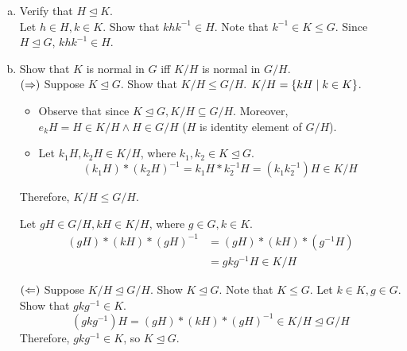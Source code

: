 \begin{solution} \phantom{blank}

    \begin{enumerate}[(a)]
        \item Verify that $H \unlhd K$. \\
        Let $h \in H, k \in K$. Show that $khk^{-1} \in H$. Note that $k^{-1} \in K \leq G$. Since $ H \unlhd G$, $khk^{-1} \in H$.
        \item Show that $K$ is normal in $G$ iff $K/H$ is normal in $G/H$.\\
        $\qty(\Rightarrow)$ Suppose $K \unlhd G$. Show that $K/H \leq G/H$. $K/H = \qty{kH \mid k \in K}$. 
        \begin{itemize}
            \item Observe that since $K \unlhd G, K/H \subseteq G/H$. Moreover, $e_kH = H \in K/H \land H \in G/H$ \hspace{1em} ($H$ is identity element of $G / H$).
            \item Let $k_1H, k_2H \in K/H$, where $k_1, k_2 \in K \unlhd G$.
            \[ (k_1H) \ast (k_2H)^{-1} = k_1H \ast k_2^{-1} H = (k_1k_2^{-1})H \in K/H \]
        \end{itemize}
        Therefore, $K/H \leq G/H$.
        
        Let $gH \in G/H, kH \in K/H$, where $g \in G, k \in K$.
        \begin{align*}
            (gH) \ast (kH) \ast (gH)^{-1} &= (gH) \ast (kH) \ast ( g^{-1}H) \\
            &= gkg^{-1} H \in K/H
        \end{align*}
        
        $\qty(\Leftarrow)$ Suppose $K/H \unlhd G/H$. Show $K \unlhd G$. Note that $K \leq G$. Let $k \in K, g \in G$. Show that $gkg^{-1} \in K$.
        \[ (gkg^{-1}) H = (gH) \ast (kH) \ast (gH)^{-1} \in K/H \unlhd G/H \]
        Therefore, $gkg^{-1} \in K$, so $K \unlhd G$. \qedsymbol
    \end{enumerate}
\end{solution}